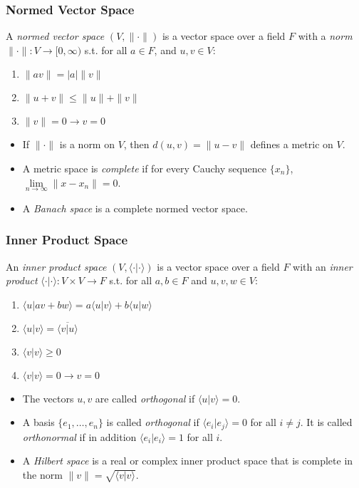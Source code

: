 \documentclass[UTF8,aspectratio=43,11pt,colorlinks,compress,openany]{beamer}%
\begin{document}
\begin{frame}\frametitle{Normed Vector Space}
	\begin{definition}
		A \emph{normed vector space} $(V,\|\cdot\|)$ is a vector space over a field $F$ with a \emph{norm} $\|\cdot\|: V\to[0,\infty)$ s.t. for all $a\in F$, and $u,v\in V$:
		\begin{enumerate}
			\item $\|av\|=|a|\|v\|$
			\item $\|u+v\|\leq \|u\|+\|v\|$
			\item $\|v\|=0\to v=0$
		\end{enumerate}
	\end{definition}
\begin{itemize}
	\item If $\|\cdot\|$ is a norm on $V$, then $d(u,v)=\|u-v\|$ defines a metric on $V$.
	\item A metric space is \emph{complete} if for every Cauchy sequence $\{x_n\}$, $\lim\limits_{n\to\infty}\|x-x_n\|=0$.
	\item A \emph{Banach space} is a complete normed vector space.
\end{itemize}
\end{frame}

\begin{frame}\frametitle{Inner Product Space}
	\begin{definition}
		An \emph{inner product space} $(V,\langle\cdot|\cdot\rangle)$ is a vector space over a field $F$ with an \emph{inner product} $\langle\cdot|\cdot\rangle:V\times V\to F$ s.t. for all $a,b\in F$ and $u,v,w\in V$:
		\begin{enumerate}
			\item $\langle u|av+bw\rangle=a\langle u|v\rangle+b\langle u|w\rangle$
			\item $\langle u|v\rangle=\overline{\langle v|u\rangle}$
			\item $\langle v|v\rangle\geq 0$
			\item $\langle v|v\rangle=0\to v=0$
		\end{enumerate}
	\end{definition}
	\begin{itemize}
		\item The vectors $u,v$ are called \emph{orthogonal} if $\langle u|v\rangle=0$.
		\item A basis $\{e_1,\dots,e_n\}$ is called \emph{orthogonal} if $\langle e_i|e_j\rangle=0$ for all $i\ne j$. It is called \emph{orthonormal} if in addition $\langle e_i|e_i\rangle=1$ for all $i$.
		\item A \emph{Hilbert space} is a real or complex inner product space that is complete in the norm $\|v\|=\sqrt{\langle v|v\rangle}$.
	\end{itemize}
\end{frame}
\end{document}
